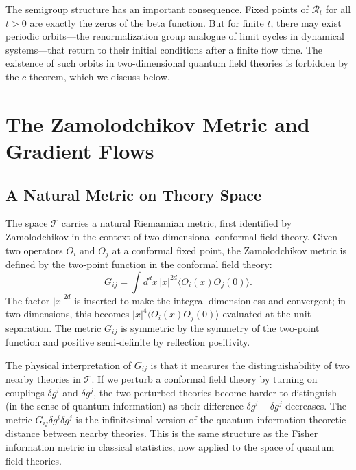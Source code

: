 \documentclass[11pt, twoside, openright]{book}
\theoremstyle{dotted}
\theoremstyle{definition}
\newcommand{\cT}{\mathcal{T}}          %
\begin{document}
The semigroup structure has an important consequence. Fixed points of $\mathcal{R}_t$
for all $t > 0$ are exactly the zeros of the beta function. But for finite $t$,
there may exist periodic orbits---the renormalization group analogue of limit cycles
in dynamical systems---that return to their initial conditions after a finite flow
time. The existence of such orbits in two-dimensional quantum field theories is
forbidden by the $c$-theorem, which we discuss below.

\chapter{The Zamolodchikov Metric and Gradient Flows}
\label{ch:zamolodchikov}

\section{A Natural Metric on Theory Space}

The space $\cT$ carries a natural Riemannian metric, first identified by
Zamolodchikov in the context of two-dimensional conformal field theory. Given
two operators $O_i$ and $O_j$ at a conformal fixed point, the Zamolodchikov metric
is defined by the two-point function in the conformal field theory:
\begin{equation}
  G_{ij} = \int d^dx \, |x|^{2d} \langle O_i(x) O_j(0)\rangle.
  \label{eq:zamolodchikov_metric}
\end{equation}
The factor $|x|^{2d}$ is inserted to make the integral dimensionless and convergent;
in two dimensions, this becomes $|x|^4\langle O_i(x) O_j(0)\rangle$ evaluated at
the unit separation. The metric $G_{ij}$ is symmetric by the symmetry of the
two-point function and positive semi-definite by reflection positivity.

The physical interpretation of $G_{ij}$ is that it measures the distinguishability
of two nearby theories in $\cT$. If we perturb a conformal field theory by turning
on couplings $\delta g^i$ and $\delta g^j$, the two perturbed theories become
harder to distinguish (in the sense of quantum information) as their difference
$\delta g^i - \delta g^j$ decreases. The metric $G_{ij}\delta g^i \delta g^j$ is
the infinitesimal version of the quantum information-theoretic distance between
nearby theories. This is the same structure as the Fisher information metric in
classical statistics, now applied to the space of quantum field theories.
\end{document}
